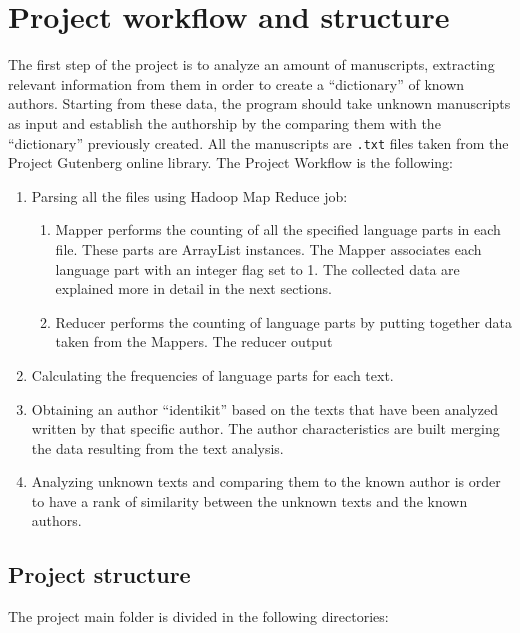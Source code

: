 \documentclass[a4paper,11pt, twoside]{article}
\begin{document}
	\section{Project workflow and structure}
	The first step of the project is to analyze an amount of manuscripts, extracting relevant information from them in order to create a ``dictionary'' of known authors. Starting from these data, the program should take unknown manuscripts as input and establish the authorship by the comparing them with the ``dictionary'' previously created. All the manuscripts are \texttt{.txt} files taken from the Project Gutenberg\parencite{Gutenberg} online library.
	The Project Workflow is the following:
	\begin{enumerate}
		\item Parsing all the files using Hadoop Map Reduce job: 
		\begin{enumerate}
			\item Mapper performs the counting of all the specified language parts in each file. These parts are ArrayList instances. The Mapper associates each language part with an integer flag set to 1. The collected data are explained more in detail in the next sections. 
			
			\item Reducer performs the counting of language parts by putting together data taken from the Mappers. The reducer output  
		\end{enumerate}
		\item Calculating the frequencies of language parts for each text.
		\item Obtaining an author ``identikit'' based on the texts that have been analyzed written by that specific author. The author characteristics are built merging the data resulting from the text analysis.
		\item Analyzing unknown texts and comparing them to the known author is order to have a rank of similarity between the unknown texts and the known authors.
	\end{enumerate}

	\subsection{Project structure}
	The project main folder is divided in the following directories:
	\begin{figure}[h!]
	\end{figure}
\end{document}
